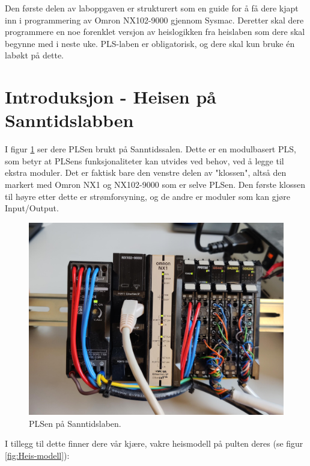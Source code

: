 \begin{alphasection}
Den første delen av laboppgaven er strukturert som en guide for å få dere kjapt inn i programmering av Omron NX102-9000 gjennom Sysmac. Deretter skal dere programmere en noe forenklet versjon av heislogikken fra heislaben som dere skal begynne med i neste uke. PLS-laben er obligatorisk, og dere skal kun bruke én labøkt på dette.

\section{Introduksjon - Heisen på Sanntidslabben}\label{sec:1-intro}
I figur \ref{fig:omron-pls} ser dere PLSen brukt på Sanntidssalen. Dette er en modulbasert PLS, som betyr at PLSens funksjonaliteter kan utvides ved behov, ved å legge til ekstra moduler. Det er faktisk bare den venstre delen av "klossen", altså den markert med Omron NX1 og NX102-9000 som er selve PLSen. Den første klossen til høyre etter dette er strømforsyning, og de andre er moduler som kan gjøre Input/Output. 

\begin{figure}[ht]
    \centering
    \includegraphics[scale=0.1]{figures/omron-pls.jpg}
    \caption{PLSen på Sanntidslaben.}
    \label{fig:omron-pls}
\end{figure}

I tillegg til dette finner dere vår kjære, vakre heismodell på pulten deres (se figur \ref{fig:Heis-modell}):



\end{alphasection}

